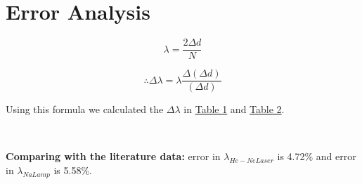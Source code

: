 \section{Error Analysis}

    $$\lambda = \frac{2\Delta d}{N}$$


    $$\therefore \Delta\lambda = \lambda\frac{\Delta(\Delta d)}{(\Delta d)}$$

    Using this formula we calculated the $\Delta \lambda$ in \hyperref[tab:hene]{Table 1} and \hyperref[tab:na]{Table 2}.

    \begin{center}
        \\
        \vspace{1mm}
    \end{center}

    \textbf{Comparing with the literature data:} error in $\lambda_{He-Ne Laser}$ is 4.72\% and error in $\lambda_{Na Lamp}$ is 5.58\%.
